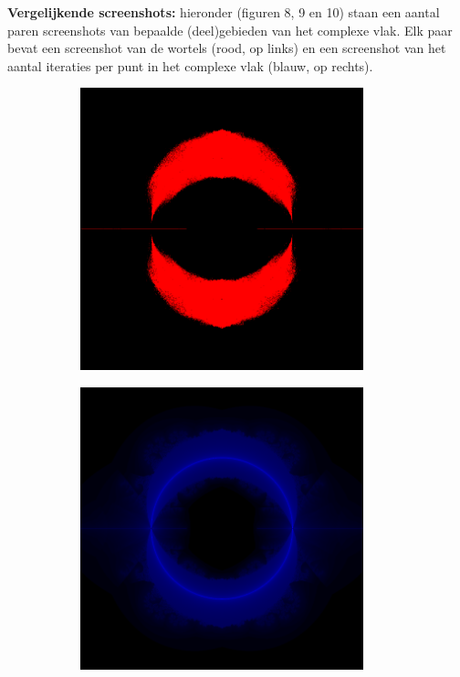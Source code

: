 \documentclass{article}
\begin{document}
\textbf{Vergelijkende screenshots:} hieronder (figuren 8, 9 en 10) staan een aantal paren screenshots van bepaalde (deel)gebieden van het complexe vlak. Elk paar bevat een screenshot van de wortels (rood, op links) en een screenshot van het aantal iteraties per punt in het complexe vlak (blauw, op rechts).
\begin{figure}[!h]
 \caption{Zoom $1.0$, gecentreerd rond $z = 0$}
 \begin{subfigure}{0.49\textwidth}
  \includegraphics[width=0.9\textwidth]{elegant-gl/scrsh/left_8}
 \end{subfigure}
 \begin{subfigure}{0.49\textwidth}
  \includegraphics[width=0.9\textwidth]{elegant-gl/scrsh/right_8}
 \end{subfigure}
\end{figure}
\end{document}
